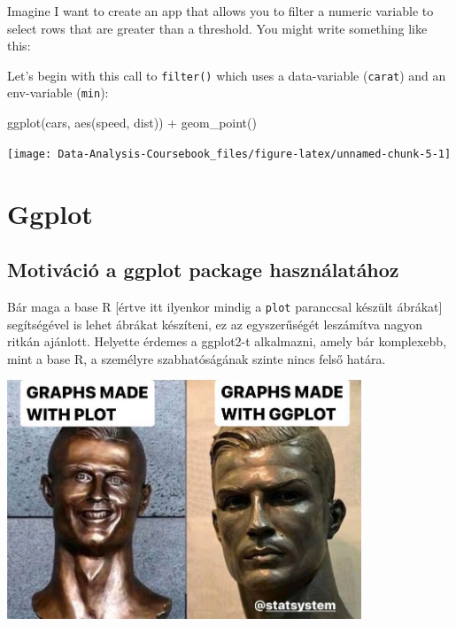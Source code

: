 \documentclass[
]{article}
\newenvironment{Shaded}{\begin{snugshade}}{\end{snugshade}}
\newcommand{\FunctionTok}[1]{\textcolor[rgb]{0.00,0.00,0.00}{#1}}
\newcommand{\NormalTok}[1]{#1}
\newcommand{\SpecialCharTok}[1]{\textcolor[rgb]{0.00,0.00,0.00}{#1}}
\begin{document}
Imagine I want to create an app that allows you to filter a numeric variable to select rows that are greater than a threshold.
You might write something like this:

Let's begin with this call to \texttt{filter()} which uses a data-variable (\texttt{carat}) and an env-variable (\texttt{min}):

\begin{Shaded}
\begin{Highlighting}[]
\FunctionTok{ggplot}\NormalTok{(cars, }\FunctionTok{aes}\NormalTok{(speed, dist)) }\SpecialCharTok{+} 
  \FunctionTok{geom\_point}\NormalTok{()}
\end{Highlighting}
\end{Shaded}

\begin{center}\texttt{[image: Data-Analysis-Coursebook\_files/figure-latex/unnamed-chunk-5-1]} \end{center}

\hypertarget{seminar4}{%
\section{Ggplot}\label{seminar4}}

\hypertarget{motivuxe1ciuxf3-a-ggplot-package-hasznuxe1latuxe1hoz}{%
\subsection{Motiváció a ggplot package használatához}\label{motivuxe1ciuxf3-a-ggplot-package-hasznuxe1latuxe1hoz}}

Bár maga a base R {[}értve itt ilyenkor mindig a \texttt{plot} paranccsal készült ábrákat{]} segítségével is lehet ábrákat készíteni, ez az egyszerűségét leszámítva nagyon ritkán ajánlott. Helyette érdemes a ggplot2-t alkalmazni, amely bár komplexebb, mint a base R, a személyre szabhatóságának szinte nincs felső határa.

\includegraphics[width=4.16667in,height=\textheight]{images/plot_ggplot.jpg}
\end{document}
